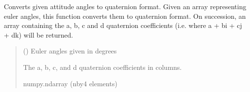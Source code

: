 \documentclass[letterpaper,10pt,english]{sphinxmanual}
\begin{document}
\begin{fulllineitems}
\label{\detokenize{modules/util/transformations:qnav.util.transformations.euler_to_quaternion_vec}}
\pysigstartsignatures
{}
\pysigstopsignatures
\sphinxAtStartPar
Converts given attitude angles to quaternion format.
Given an array representing euler angles, this function converts them to
quaternion format. On succession, an array containing the a, b, c and d
quaternion coefficients (i.e. where a + bi + cj + dk) will be returned.
\begin{quote}\begin{description}
\sphinxAtStartPar
{} (\sphinxstyleliteralemphasis{\sphinxupquote{ (}}\sphinxstyleliteralemphasis{\sphinxupquote{)}}) \textendash{} Euler angles given in degrees

\sphinxAtStartPar
The a, b, c, and d quaternion coefficients in columns.

\sphinxAtStartPar
numpy.ndarray (n\sphinxhyphen{}by\sphinxhyphen{}4 elements)

\end{description}\end{quote}

\end{fulllineitems}

\end{document}
